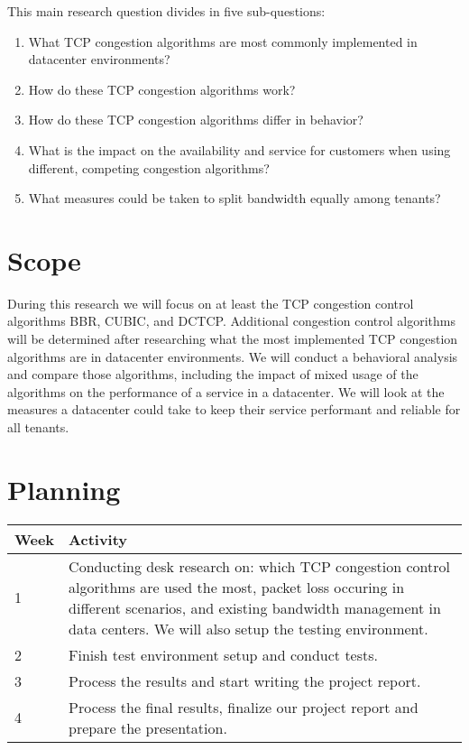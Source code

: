 \documentclass{article}
\begin{document}
\vspace{0.5cm}

This main research question divides in five sub-questions:

\begin{enumerate}
	\item What TCP congestion algorithms are most commonly implemented in datacenter environments?
	\item How do these TCP congestion algorithms work?
	\item How do these TCP congestion algorithms differ in behavior?
	\item What is the impact on the availability and service for customers when using different, competing congestion algorithms?
	\item What measures could be taken to split bandwidth equally among tenants?
\end{enumerate}


\section{Scope}

During this research we will focus on at least the TCP congestion control
algorithms BBR, CUBIC, and DCTCP. Additional congestion control algorithms will
be determined after researching what the most implemented TCP congestion
algorithms are in datacenter environments. We will conduct a behavioral
analysis and compare those algorithms, including the impact of mixed usage of
the algorithms on the performance of a service in a datacenter. We will look at
the measures a datacenter could take to keep their service performant and
reliable for all tenants.


\section{Planning}

\begin{tabular}[H]{ | l | p{10.2cm} | }
	\hline
	\textbf{Week} & \textbf{Activity} \\
	\hline 1 & Conducting desk research on: which TCP congestion control algorithms are used the most, packet loss occuring in different scenarios, and existing bandwidth management in data centers. We will also setup the testing environment. \\
	\hline 2 & Finish test environment setup and conduct tests. \\
	\hline 3 & Process the results and start writing the project report. \\
	\hline 4 & Process the final results, finalize our project report and prepare the presentation. \\
	\hline
\end{tabular}
\end{document}
